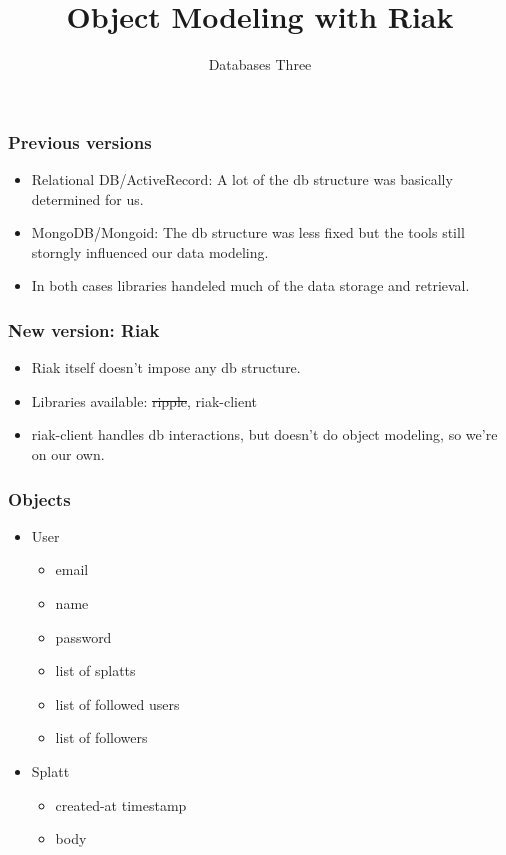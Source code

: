 \documentclass[10pt]{beamer}
\title{Object Modeling with Riak}
\author[IN705]{Databases Three}
\institute[Otago Polytechnic]{
  Otago Polytechnic \\
  Dunedin, New Zealand \\
}
\date{}
\begin{document}
\begin{frame}[plain]
  \titlepage
\end{frame}



\begin{frame}
  \frametitle{Previous versions}

  \begin{itemize}
	  \item Relational DB/ActiveRecord:  A lot of the db structure
		  was basically determined for us.
	  \item MongoDB/Mongoid:  The db structure was less fixed
		  but the tools still storngly influenced our
		  data modeling.
	  \item In both cases libraries handeled much of the data
		  storage and retrieval.
  \end{itemize}


\end{frame}



\begin{frame}
  \frametitle{New version: Riak}

 \begin{itemize}
	 \item  Riak itself doesn't impose any db structure.
	 \item  Libraries available:  \sout{ripple}, riak-client
	 \item  riak-client handles db interactions, but doesn't do object modeling, so we're on our own.
 \end{itemize}

\end{frame}



\begin{frame}
  \frametitle{Objects}
  

 \begin{itemize}
  \item User
	  \begin{itemize}
		  \item email
		  \item name
		  \item password
		  \item list of splatts
		  \item list of followed users
		  \item list of followers
	  \end{itemize}
  \item Splatt
	  \begin{itemize}
		  \item created-at timestamp
		  \item body
	  \end{itemize}
 \end{itemize}

\end{frame}
\end{document}

